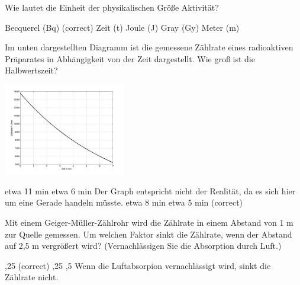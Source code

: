\documentclass[11pt]{exam}
\begin{document}
\setlength{\voffset}{-0.5in}
\setlength{\headsep}{5pt}

\hspace{2mm}
 \hspace{5mm}
\vspace{4mm}

\begin{questions}

\question Wie lautet die Einheit der physikalischen Größe Aktivität?

\begin{choices}
	\choice Becquerel (Bq) (correct)
	\choice Zeit (t)
	\choice Joule (J)
	\choice Gray (Gy)
	\choice Meter (m)
\end{choices}

\vspace{3mm}\question Im unten dargestellten Diagramm ist die gemessene Zählrate eines radioaktiven Präparates in Abhängigkeit von der Zeit dargestellt. Wie groß ist die Halbwertszeit?

\includegraphics[width=0.4\textwidth]{images/zerfall1.png}

\begin{choices}
	\choice etwa 11 min
	\choice etwa 6 min
	\choice Der Graph entspricht nicht der Realität, da es sich hier um eine Gerade handeln müsste.
	\choice etwa 8 min
	\choice etwa 5 min (correct)
\end{choices}

\vspace{3mm}\question Mit einem Geiger-Müller-Zählrohr wird die Zählrate in einem Abstand von 1 m zur Quelle gemessen. Um welchen Faktor sinkt die Zählrate, wenn der Abstand auf 2,5 m vergrößert wird? (Vernachlässigen Sie die Absorption durch Luft.)

\begin{choices}
	,25 (correct)
	,25
	,5
	\choice Wenn die Luftabsorpion vernachlässigt wird, sinkt die Zählrate nicht.
\end{choices}


\end{questions}
\end{document}
